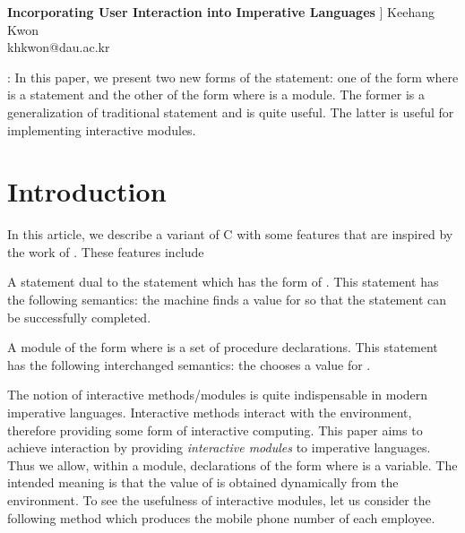 \documentclass[12pt]{article}
\title{}
\newenvironment{numberedlist}
{\begin{list}{\makebox[20pt]{\hss(\arabic{itemno})\enspace}}
             {\usecounter{itemno}\labelwidth 20pt}}{\end{list}}
\newcounter{itemno}
\newcounter{itemno1}
\newcounter{itemno2}
\begin{document}
	
\begin{center}
{\Large {\bf 
Incorporating  User Interaction  into Imperative  Languages}}
\20pt] 
Keehang Kwon \\
khkwon@dau.ac.kr
\end{center}
	
: 
In this paper, we  present two new forms of the  statement: one  of the form 
where  is a statement and the other of the form  where  is a module.
The former is a generalization of traditional  statement and is
quite useful.  The latter is useful for implementing interactive modules.








\section{Introduction}\label{sec:intro}

In this article, we describe a variant of C with some features that are 
inspired by the work of \cite{Jap03}.
These features include

\begin{numberedlist}

\item A  statement dual to the  statement which has the form of
     . This statement  has the following  semantics: the machine finds
    a value  for  so that the statement   can be successfully completed.

\item A  module of the form  where  is a set of procedure declarations.
This  statement  has the following interchanged semantics:  the  chooses 
    a value  for .

\end{numberedlist}

The notion of interactive methods/modules is quite indispensable in modern imperative languages. 
Interactive  methods interact with the environment, therefore providing some form of 
interactive computing. This paper aims to achieve interaction by providing {\it interactive modules}
 to imperative languages. Thus we allow, within a module, declarations of the form  where  is a variable.
 The intended meaning is that  the value of  is obtained dynamically from the environment.
  To see the usefulness of interactive modules, let us consider the following method which produces the mobile phone number of each employee.
\end{document}
